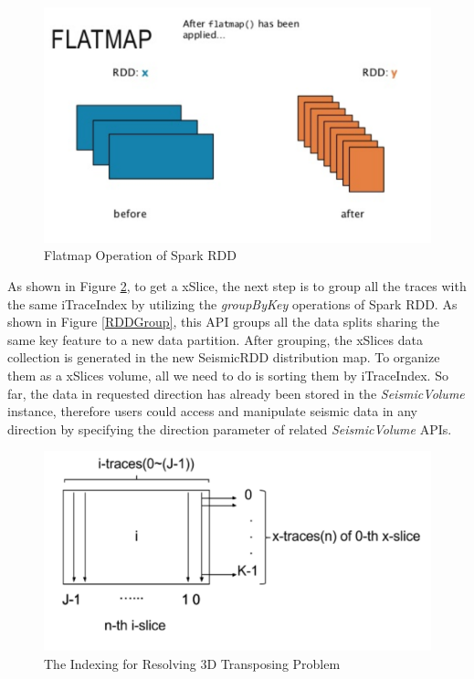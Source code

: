 \begin{figure}[h]
\centering
\includegraphics[scale=0.8]{figures/RDDFlatmap.png}
\caption{Flatmap Operation of Spark RDD}
\label{RDDFlatmap}
\end{figure}


As shown in Figure \ref{VolumeTrans}, to get a xSlice, the next step is to group all the traces with the same iTraceIndex by utilizing the \emph{groupByKey} operations of Spark RDD. As shown in Figure \ref{RDDGroup}, this API groups all the data splits sharing the same key feature to a new data partition. After grouping, the xSlices data collection is generated in the new SeismicRDD distribution map. To organize them as a xSlices volume, all we need to do is sorting them by iTraceIndex. So far, the data in requested direction has already been stored in the \emph{SeismicVolume} instance, therefore users could access and manipulate seismic data in any direction by specifying the direction parameter of related \emph{SeismicVolume} APIs.

\begin{figure}[h]
\centering
\includegraphics[scale=0.6]{figures/VolumeTrans.png}
\caption{The Indexing for Resolving 3D Transposing Problem}
\label{VolumeTrans}
\end{figure}


